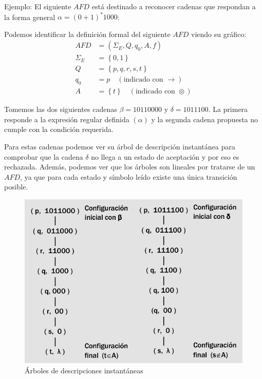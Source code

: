 \documentclass[12pt]{article}
\begin{document}
Ejemplo: El siguiente $ AFD $ está destinado a reconocer cadenas que respondan a la forma general $ \alpha=(0+1)^{*}1000 $:
\begin{center}
\end{center}
Podemos identificar la definición formal del siguiente $ AFD $ viendo su gráfico:
\begin{align*}
  AFD &= \left(\Sigma_{E},Q,q_{0},A,f\right)\\
  \Sigma_{E} &= \left\{0,1\right\}\\
  Q &= \left\{p,q,r,s,t\right\}\\
  q_{0} &= p \quad (\text{indicado con } \to) \\
  A &= \left\{t\right\} \quad (\text{indicado con } \circledcirc)
\end{align*}

Tomemos las dos siguientes cadenas $ \beta=10110000 $ y $ \delta=1011100 $. La primera responde a la expresión regular definida $ (\alpha) $ y la segunda cadena propuesta no cumple con la condición requerida.

Para estas cadenas podemos ver su árbol de descripción instantánea para comprobar que la cadena $ \delta $ no llega a un estado de aceptación y por eso es rechazada. Además, podemos ver que los árboles son lineales por tratarse de un $ AFD $, ya que para cada estado y símbolo leído existe una única transición posible.

\begin{figure}[H]
  \centering
  \includegraphics[width=0.5\linewidth]{imagenes/arbol_afd.png}
  \caption{Árboles de descripciones instantáneas}
  \label{fig:arbol_afd}
\end{figure}
\end{document}
